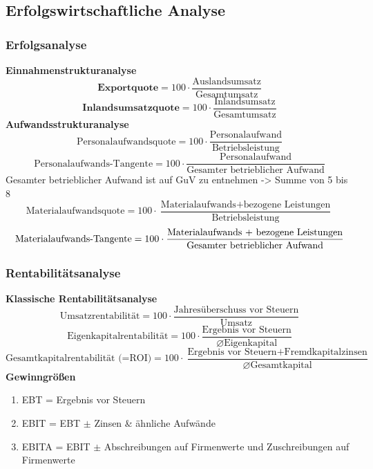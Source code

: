 \documentclass[11pt]{scrartcl}
\begin{document}
\subsection[]{Erfolgswirtschaftliche Analyse}
\subsubsection[]{Erfolgsanalyse}
\textbf{Einnahmenstrukturanalyse}
\begin{equation}
    \textbf{Exportquote} = 100\cdot\frac{\text{Auslandsumsatz}}{\text{Gesamtumsatz}}
\end{equation}
\begin{equation}
    \textbf{Inlandsumsatzquote} = 100\cdot\frac{\text{Inlandsumsatz}}{\text{Gesamtumsatz}}
\end{equation}
\textbf{Aufwandsstrukturanalyse}
\begin{equation}
    \text{Personalaufwandsquote} = 100\cdot\frac{\text{Personalaufwand}}{\text{Betriebsleistung}}
\end{equation}
\begin{equation}
    \text{Personalaufwands-Tangente} = 100\cdot\frac{\text{Personalaufwand}}{\text{Gesamter betrieblicher Aufwand}}
\end{equation}
Gesamter betrieblicher Aufwand ist auf GuV zu entnehmen -> Summe von 5 bis 8
\begin{equation}
    \text{Materialaufwandsquote} = 100\cdot\frac{\text{Materialaufwands}+\text{bezogene Leistungen}}{\text{Betriebsleistung}}
\end{equation}
\begin{equation}
    \text{Materialaufwands-Tangente} = 100\cdot\frac{\text{\text{Materialaufwands} + \text{bezogene Leistungen}}}{\text{Gesamter betrieblicher Aufwand}}
\end{equation}
\subsubsection[]{Rentabilitätsanalyse}
\textbf{Klassische Rentabilitätsanalyse}
\begin{equation}
    \text{Umsatzrentabilität} = 100\cdot\frac{\text{Jahresüberschuss vor Steuern}}{\text{Umsatz}}
\end{equation}
\begin{equation}
    \text{Eigenkapitalrentabilität} = 100\cdot\frac{\text{Ergebnis vor Steuern}}{\varnothing\text{Eigenkapital}}
\end{equation}
\begin{equation}
    \text{Gesamtkapitalrentabilität (=ROI)} = 100\cdot\frac{\text{Ergebnis vor Steuern} + \text{Fremdkapitalzinsen}}{\varnothing\text{Gesamtkapital}}
\end{equation}
\textbf{Gewinngrößen}
\begin{enumerate}
    \item EBT = Ergebnis vor Steuern
    \item EBIT = EBT $\pm$ Zinsen \& ähnliche Aufwände
    \item EBITA = EBIT $\pm$ Abschreibungen auf Firmenwerte und Zuschreibungen auf Firmenwerte
\end{enumerate}
\end{document}
